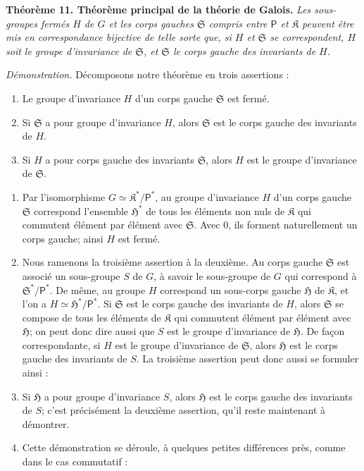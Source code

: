 \textbf{Théorème 11. Théorème principal de la théorie de Galois.} \emph{Les sous-groupes fermés \(H\) de \(G\) et les corps gauches \(\mathfrak S\) compris entre \(\mathsf P\) et \(\mathfrak K\) peuvent être mis en correspondance bijective de telle sorte que, si \(H\) et \(\mathfrak S\) se correspondent, \(H\) soit le groupe d'invariance de \(\mathfrak S\), et \(\mathfrak S\) le corps gauche des invariants de \(H\).}

\emph{Démonstration.} Décomposons notre théorème en trois assertions :
\begin{enumerate}
\item Le groupe d'invariance \(H\) d'un corps gauche \(\mathfrak S\) est fermé.
\item Si \(\mathfrak S\) a pour groupe d'invariance \(H\), alors \(\mathfrak S\) est le corps gauche des invariants de \(H\).
\item Si \(H\) a pour corps gauche des invariants \(\mathfrak S\), alors \(H\) est le groupe d'invariance de \(\mathfrak S\).
\end{enumerate}

\begin{enumerate}
\item Par l'isomorphisme \(G\simeq\mathfrak K^*/\mathsf P^*\), au groupe d'invariance \(H\) d'un corps gauche \(\mathfrak S\) correspond l'ensemble \(\mathfrak H^*\) de tous les éléments non nuls de \(\mathfrak K\) qui commutent élément par élément avec \(\mathfrak S\). Avec \(0\), ils forment naturellement un corps gauche; ainsi \(H\) est fermé.

\item Nous ramenons la troisième assertion à la deuxième. Au corps gauche \(\mathfrak S\) est associé un sous-groupe \(S\) de \(G\), à savoir le sous-groupe de \(G\) qui correspond à \(\mathfrak S^*/\mathsf P^*\). De même, au groupe \(H\) correspond un sous-corps gauche \(\mathfrak H\) de \(\mathfrak K\), et l'on a \(H\simeq\mathfrak H^*/\mathsf P^*\). Si \(\mathfrak S\) est le corps gauche des invariants de \(H\), alors \(\mathfrak S\) se compose de tous les éléments de \(\mathfrak K\) qui commutent élément par élément avec \(\mathfrak H\); on peut donc dire aussi que \(S\) est le groupe d'invariance de \(\mathfrak H\). De façon correspondante, si \(H\) est le groupe d'invariance de \(\mathfrak S\), alors \(\mathfrak H\) est le corps gauche des invariants de \(S\). La troisième assertion peut donc aussi se formuler ainsi :

\item[\(3'\).] Si \(\mathfrak H\) a pour groupe d'invariance \(S\), alors \(\mathfrak H\) est le corps gauche des invariants de \(S\); c'est précisément la deuxième assertion, qu'il reste maintenant à démontrer.

\item[3.] Cette démonstration se déroule, à quelques petites différences près, comme dans le cas commutatif :
\end{enumerate}

